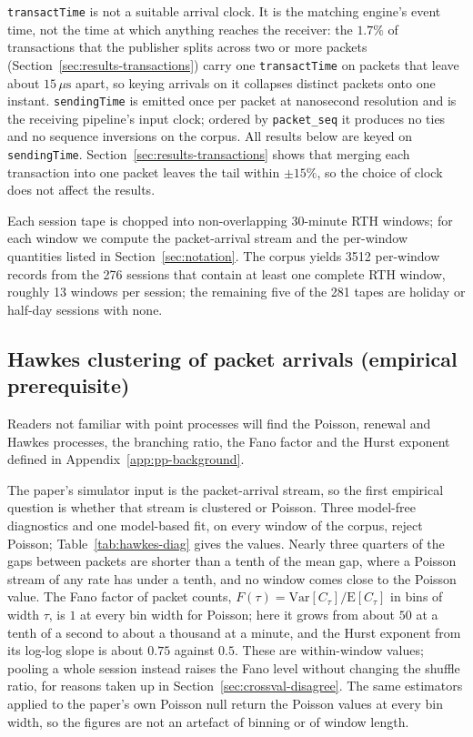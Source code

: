 \documentclass[11pt]{article}
\begin{document}
\texttt{transactTime} is not a suitable arrival clock. It is the matching engine's event
time, not the time at which anything reaches the receiver: the $1.7\%$ of transactions
that the publisher splits across two or more packets
(Section~\ref{sec:results-transactions}) carry one \texttt{transactTime} on packets that
leave about $15\,\mu\mathrm{s}$ apart, so keying arrivals on it collapses distinct
packets onto one instant. \texttt{sendingTime} is emitted once per packet at nanosecond
resolution and is the receiving pipeline's input clock; ordered by \texttt{packet\_seq}
it produces no ties and no sequence inversions on the corpus. All results below are keyed
on \texttt{sendingTime}. Section~\ref{sec:results-transactions} shows that merging each
transaction into one packet leaves the tail within $\pm 15\%$, so the choice of clock
does not affect the results.

Each session tape is chopped into
non-overlapping 30-minute RTH windows; for each window we compute the packet-arrival
stream and the per-window quantities listed in Section~\ref{sec:notation}. The corpus
yields 3512 per-window records from the 276 sessions that contain at least one complete
RTH window, roughly 13 windows per session; the remaining five of the 281 tapes are
holiday or half-day sessions with none.


\subsection{Hawkes clustering of packet arrivals (empirical prerequisite)}
\label{sec:setup-hawkes}

Readers not familiar with point processes will find the Poisson, renewal and Hawkes
processes, the branching ratio, the Fano factor and the Hurst exponent defined in
Appendix~\ref{app:pp-background}.

The paper's simulator input is the packet-arrival stream, so the first empirical question
is whether that stream is clustered or Poisson. Three model-free diagnostics and one
model-based fit, on every window of the corpus, reject Poisson; Table~\ref{tab:hawkes-diag}
gives the values. Nearly three quarters of the gaps between packets are shorter than a
tenth of the mean gap, where a Poisson stream of any rate has under a tenth, and no window
comes close to the Poisson value. The Fano factor of packet counts,
$F(\tau) = \mathrm{Var}[C_\tau] / \mathrm{E}[C_\tau]$ in bins of width $\tau$, is $1$ at
every bin width for Poisson; here it grows from about $50$ at a tenth of a second to about
a thousand at a minute, and the Hurst exponent from its log-log slope is about $0.75$
against $0.5$. These are within-window values; pooling a whole session instead raises the
Fano level without changing the shuffle ratio, for reasons taken up in
Section~\ref{sec:crossval-disagree}. The same estimators applied to the paper's own
Poisson null return the Poisson values at every bin width, so the figures are not an
artefact of binning or of window length.
\end{document}
